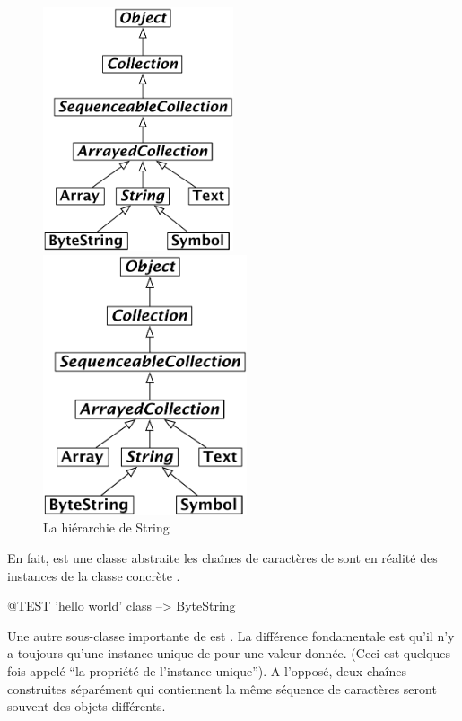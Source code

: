 \documentclass[a4paper,10pt,twoside]{book}
\begin{document}
\begin{figure}[ht]
\ifluluelse
	{\centerline {\includegraphics[width=0.5\textwidth]{StringHierarchy}}}
	{\centerline {\includegraphics[width=6cm]{StringHierarchy}}}
\caption{La hiérarchie de String \label{fig:strings}}
\end{figure}

En fait,  est une classe abstraite les chaînes de caractères de \squeak sont en réalité des instances de la classe concrète .

\begin{code}{@TEST}
'hello world' class --> ByteString
\end{code}

Une autre sous-classe importante de  est .  La différence fondamentale est qu'il n'y a toujours qu'une instance unique de  pour une valeur donnée.  (Ceci est quelques fois appelé ``la propriété de l'instance unique'').  A l'opposé, deux chaînes construites séparément  qui contiennent la même séquence de caractères seront souvent des objets différents.
\end{document}
